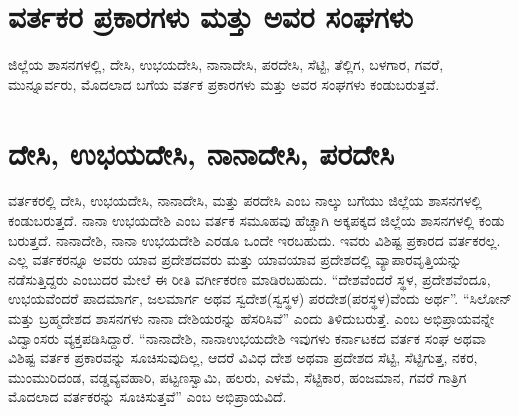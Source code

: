 \section{ವರ್ತಕರ ಪ್ರಕಾರಗಳು ಮತ್ತು ಅವರ ಸಂಘಗಳು}

ಜಿಲ್ಲೆಯ ಶಾಸನಗಳಲ್ಲಿ, ದೇಸಿ, ಉಭಯದೇಸಿ, ನಾನಾದೇಸಿ, ಪರದೇಸಿ, ಸೆಟ್ಟಿ, ತೆಲ್ಲಿಗ, ಬಳಗಾರ, ಗವರೆ, ಮುನ್ನೂರ್ವರು, ಮೊದಲಾದ ಬಗೆಯ ವರ್ತಕ ಪ್ರಕಾರಗಳು ಮತ್ತು ಅವರ ಸಂಘಗಳು ಕಂಡುಬರುತ್ತವೆ.


\section{ದೇಸಿ, ಉಭಯದೇಸಿ, ನಾನಾದೇಸಿ, ಪರದೇಸಿ}

ವರ್ತಕರಲ್ಲಿ ದೇಸಿ, ಉಭಯದೇಸಿ, ನಾನಾದೇಸಿ, ಮತ್ತು ಪರದೇಸಿ ಎಂಬ ನಾಲ್ಕು ಬಗೆಯು ಜಿಲ್ಲೆಯ ಶಾಸನಗಳಲ್ಲಿ ಕಂಡುಬರುತ್ತದೆ. ನಾನಾ ಉಭಯದೇಶಿ ಎಂಬ ವರ್ತಕ ಸಮೂಹವು ಹೆಚ್ಚಾಗಿ ಅಕ್ಕಪಕ್ಕದ ಜಿಲ್ಲೆಯ ಶಾಸನಗಳಲ್ಲಿ ಕಂಡು ಬರುತ್ತದೆ. ನಾನಾದೇಶಿ, ನಾನಾ ಉಭಯದೇಶಿ ಎರಡೂ ಒಂದೇ ಇರಬಹುದು. ಇವರು ವಿಶಿಷ್ಟ ಪ್ರಕಾರದ ವರ್ತಕರಲ್ಲ. ಎಲ್ಲ ವರ್ತಕರನ್ನೂ ಅವರು ಯಾವ ಪ್ರದೇಶದವರು ಮತ್ತು ಯಾವಯಾವ ಪ್ರದೇಶದಲ್ಲಿ ವ್ಯಾಪಾರವೃತ್ತಿಯನ್ನು ನಡೆಸುತ್ತಿದ್ದರು ಎಂಬುದರ ಮೇಲೆ ಈ ರೀತಿ ವರ್ಗೀಕರಣ ಮಾಡಿರಬಹುದು. “ದೇಶವೆಂದರೆ ಸ್ಥಳ, ಪ್ರದೇಶವೆಂದೂ, ಉಭಯವೆಂದರೆ ಪಾದಮಾರ್ಗ, ಜಲಮಾರ್ಗ ಅಥವ ಸ್ವದೇಶ(ಸ್ವಸ್ಥಳ) ಪರದೇಶ(ಪರಸ್ಥಳ)ವೆಂದು ಅರ್ಥ”. “ಸಿಲೋನ್​ ಮತ್ತು ಬ್ರಹ್ಮದೇಶದ ಶಾಸನಗಳು ನಾನಾ ದೇಶಿಯರನ್ನು ಹೆಸರಿಸಿವೆ” ಎಂದು ತಿಳಿದುಬರುತ್ತೆ. ಎಂಬ ಅಭಿಪ್ರಾಯವನ್ನೇ ವಿದ್ವಾಂಸರು ವ್ಯಕ್ತಪಡಿಸಿದ್ದಾರೆ. “ನಾನಾದೇಶಿ, ನಾನಾಉಭಯದೇಶಿ ಇವುಗಳು ಕರ್ನಾಟಕದ ವರ್ತಕ ಸಂಘ ಅಥವಾ ವಿಶಿಷ್ಟ ವರ್ತಕ ಪ್ರಕಾರವನ್ನು ಸೂಚಿಸುವುದಿಲ್ಲ, ಆದರೆ ವಿವಿಧ ದೇಶ ಅಥವಾ ಪ್ರದೇಶದ ಸೆಟ್ಟಿ, ಸೆಟ್ಟಿಗುತ್ತ, ನಕರ, ಮುಂಮುರಿದಂಡ, ವಡ್ಡವ್ಯವಹಾರಿ, ಪಟ್ಟಣಸ್ವಾಮಿ, ಹಲರು, ಎಳಮೆ, ಸೆಟ್ಟಿಕಾರ, ಹಂಜಮಾನ, ಗವರೆ ಗಾತ್ರಿಗ ಮೊದಲಾದ ವರ್ತಕರನ್ನು ಸೂಚಿಸುತ್ತವೆ” ಎಂಬ ಅಭಿಪ್ರಾಯವಿದೆ.

